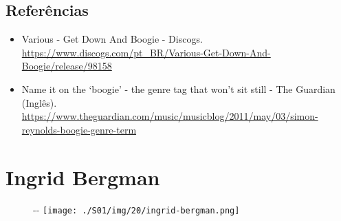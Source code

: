 \hypertarget{referuxeancias-4}{%
\subsection{Referências}\label{referuxeancias-4}}

\begin{itemize}
\tightlist
\item
  \sloppy Various ‎- Get Down And Boogie - Discogs. \url{https://www.discogs.com/pt_BR/Various-Get-Down-And-Boogie/release/98158}
\item
  \sloppy Name it on the `boogie' - the genre tag that won’t sit still - The Guardian (Inglês). \url{https://www.theguardian.com/music/musicblog/2011/may/03/simon-reynolds-boogie-genre-term}
\end{itemize}

\hypertarget{ingrid-bergman}{%
\section{Ingrid Bergman}\label{ingrid-bergman}}

\begin{figure}[!ht]
  \begin{adjustwidth}{-\oddsidemargin-1in}{-\rightmargin}
    \centering
    \texttt{[image: ./S01/img/20/ingrid-bergman.png]}
  \end{adjustwidth}
\end{figure}

